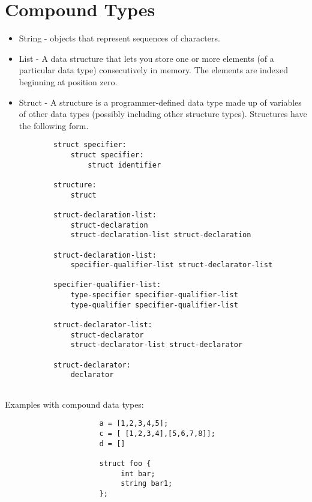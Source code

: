 \documentclass[./LRM_main.tex]{subfiles}
\begin{document}
\section{Compound Types}
\begin{itemize}
    \item String - objects that represent sequences of characters. 
    \item List - A data structure that lets you store one or more elements (of a particular data type) consecutively in memory. The elements are indexed beginning at position zero. 
    \item Struct - A structure is a programmer-defined data type made up of variables of other data types (possibly including other structure types). Structures have the following form.
    \begin{lstlisting}
        struct specifier:
            struct specifier:
                struct identifier
                
        structure:
            struct
            
        struct-declaration-list:
            struct-declaration
            struct-declaration-list struct-declaration
        
        struct-declaration-list:
            specifier-qualifier-list struct-declarator-list
        
        specifier-qualifier-list:
            type-specifier specifier-qualifier-list
            type-qualifier specifier-qualifier-list
        
        struct-declarator-list:
            struct-declarator
            struct-declarator-list struct-declarator
        
        struct-declarator:
            declarator
        
\end{lstlisting}
    
\end{itemize}

Examples with compound data types:
\begin{lstlisting}
                      a = [1,2,3,4,5];
		              c = [ [1,2,3,4],[5,6,7,8]];
		              d = []
		              
		              struct foo {
			               int bar;
			               string bar1;
                      };

\end{lstlisting}



\end{document}
